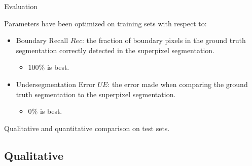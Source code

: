 \documentclass[handout]{beamer}
\begin{document}
	\begin{frame}{Evaluation}
	
		Parameters have been optimized on training sets with respect to:
		\vskip 0.25cm
		
		\begin{itemize}[label=--]
			\item Boundary Recall $Rec$: the fraction of boundary pixels in the ground truth segmentation correctly detected in the superpixel segmentation.
			\vskip 0.25cm
			\begin{itemize}[label=$\rightarrow$]
				\item $100\%$ is best.
			\end{itemize}
			\vskip 0.25cm
			\pause
			
			\item Undersegmentation Error $UE$: the error made when comparing the ground truth segmentation to the superpixel segmentation.
			\vskip 0.25cm
			\begin{itemize}[label=$\rightarrow$]
				\item $0\%$ is best.
			\end{itemize}
		\end{itemize}
		\vskip 0.25cm
		\pause
		
		Qualitative and quantitative comparison on test sets.
	\end{frame}
	
	\subsection{Qualitative}
%		
%		
%		
%		
	
\end{document}
